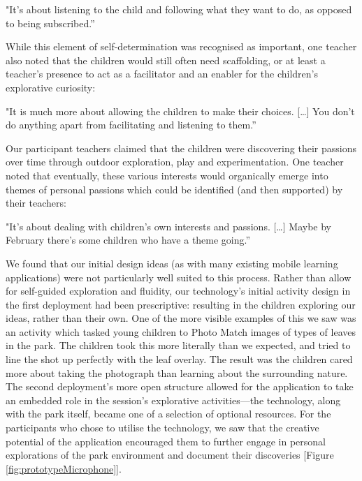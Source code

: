 \begin{displayquote}
"It's about listening to the child and following what they want to do, as opposed to being subscribed.”
\end{displayquote}

While this element of self-determination was recognised as important, one teacher also noted that the children would still often need scaffolding, or at least a teacher’s presence to act as a facilitator and an enabler for the children’s explorative curiosity:

\begin{displayquote}
"It is much more about allowing the children to make their choices. […] You don’t do anything apart from facilitating and listening to them.”
\end{displayquote}

Our participant teachers claimed that the children were discovering their passions over time through outdoor exploration, play and experimentation. One teacher noted that eventually, these various interests would organically emerge into themes of personal passions which could be identified (and then supported) by their teachers:

\begin{displayquote}
"It’s about dealing with children’s own interests and passions. […] Maybe by February there’s some children who have a theme going.”
\end{displayquote}

We found that our initial design ideas (as with many existing mobile learning applications) were not particularly well suited to this process. Rather than allow for self-guided exploration and fluidity, our technology’s initial activity design in the first deployment had been prescriptive: resulting in the children exploring our ideas, rather than their own. One of the more visible examples of this we saw was an activity which tasked young children to Photo Match images of types of leaves in the park. The children took this more literally than we expected, and tried to line the shot up perfectly with the leaf overlay. The result was the children cared more about taking the photograph than learning about the surrounding nature. The second deployment’s more open structure allowed for the application to take an embedded role in the session’s explorative activities---the technology, along with the park itself, became one of a selection of optional resources. For the participants who chose to utilise the technology, we saw that the creative potential of the application encouraged them to further engage in personal explorations of the park environment and document their discoveries [Figure \ref{fig:prototypeMicrophone}].

